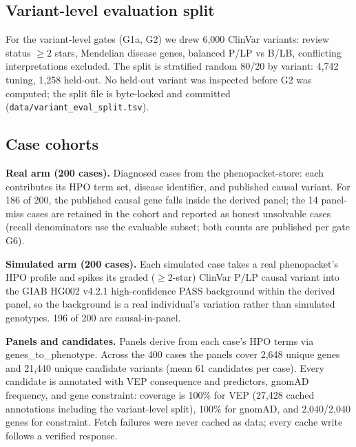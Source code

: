 \documentclass[11pt]{article}
\begin{document}
\subsection{Variant-level evaluation split}
For the variant-level gates (G1a, G2) we drew 6,000 ClinVar variants: review status
$\geq 2$ stars, Mendelian disease genes, balanced P/LP vs B/LB, conflicting
interpretations excluded. The split is stratified random 80/20 by variant: 4,742
tuning, 1,258 held-out. No held-out variant was inspected before G2 was computed;
the split file is byte-locked and committed (\texttt{data/variant\_eval\_split.tsv}).

\subsection{Case cohorts}
\textbf{Real arm (200 cases).} Diagnosed cases from the phenopacket-store: each
contributes its HPO term set, disease identifier, and published causal variant. For
186 of 200, the published causal gene falls inside the derived panel; the 14
panel-miss cases are retained in the cohort and reported as honest unsolvable cases
(recall denominators use the evaluable subset; both counts are published per gate
G6).

\textbf{Simulated arm (200 cases).} Each simulated case takes a real phenopacket's
HPO profile and spikes its graded ($\geq 2$-star) ClinVar P/LP causal variant into
the GIAB HG002 v4.2.1 high-confidence PASS background within the derived panel, so
the background is a real individual's variation rather than simulated genotypes.
196 of 200 are causal-in-panel.

\textbf{Panels and candidates.} Panels derive from each case's HPO terms via
genes\_to\_phenotype. Across the 400 cases the panels cover 2,648 unique genes and
21,440 unique candidate variants (mean 61 candidates per case). Every candidate is
annotated with VEP consequence and predictors, gnomAD frequency, and gene constraint:
coverage is 100\% for VEP (27,428 cached annotations including the variant-level
split), 100\% for gnomAD, and 2,040/2,040 genes for constraint. Fetch failures were
never cached as data; every cache write follows a verified response.
\end{document}
